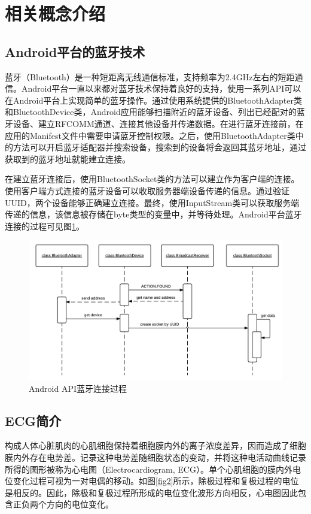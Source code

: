 \section{相关概念介绍}

\subsection{Android平台的蓝牙技术}
蓝牙（Bluetooth）是一种短距离无线通信标准，支持频率为2.4GHz左右的短距通信。Android平台一直以来都对蓝牙技术保持着良好的支持，使用一系列API可以在Android平台上实现简单的蓝牙操作。通过使用系统提供的BluetoothAdapter类和BluetoothDevice类，Android应用能够扫描附近的蓝牙设备、列出已经配对的蓝牙设备、建立RFCOMM通道、连接其他设备并传递数据\cite{androidbt}。在进行蓝牙连接前，在应用的Manifest文件中需要申请蓝牙控制权限。之后，使用BluetoothAdapter类中的方法可以开启蓝牙适配器并搜索设备，搜索到的设备将会返回其蓝牙地址，通过获取到的蓝牙地址就能建立连接。

在建立蓝牙连接后，使用BluetoothSocket类的方法可以建立作为客户端的连接。使用客户端方式连接的蓝牙设备可以收取服务器端设备传递的信息。通过验证UUID，两个设备能够正确建立连接。最终，使用InputStream类可以获取服务端传递的信息，该信息被存储在byte类型的变量中，并等待处理。Android平台蓝牙连接的过程可见图\ref{fig1}。

\begin{figure}[htbp]
\centering
\includegraphics[width=0.9\columnwidth]{fig1.png}
\caption{
\label{fig1}
Android API蓝牙连接过程
}
\end{figure}

\subsection{ECG简介}

构成人体心脏肌肉的心肌细胞保持着细胞膜内外的离子浓度差异，因而造成了细胞膜内外存在电势差。记录这种电势差随细胞状态的变动，并将这种电活动曲线记录所得的图形被称为心电图（Electrocardiogram, ECG）。单个心肌细胞的膜内外电位变化过程可视为一对电偶的移动。如图\ref{fig2}所示，除极过程和复极过程的电位是相反的。因此，除极和复极过程所形成的电位变化波形方向相反，心电图因此包含正负两个方向的电位变化\cite{Diag}。

